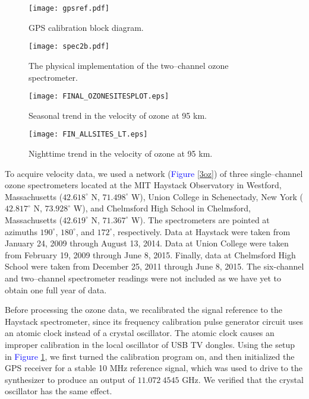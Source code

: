 \documentclass[11pt]{article}
\begin{document}
	\begin{figure}[t]
		\centering
		\texttt{[image: gpsref.pdf]}
		\caption{GPS calibration block diagram.}
		\label{gpsref}
	\end{figure}
	
	\begin{figure}[t]
		\centering
		\centerline{\texttt{[image: spec2b.pdf]}}
		\caption{The physical implementation of the two--channel ozone spectrometer.}
		\label{spectr}
	\end{figure}
	
	\begin{figure}[t]
		\centering
		\centerline{\texttt{[image: FINAL\_OZONESITESPLOT.eps]}}
		\caption{Seasonal trend in the velocity of ozone at 95 km.}
		\label{ozoneresults}
	\end{figure}	
	
	\begin{figure}[t]
		\centering
		\centerline{\texttt{[image: FIN\_ALLSITES\_LT.eps]}}
		\caption{Nighttime trend in the velocity of ozone at 95 km.}
		\label{ozonelt}
	\end{figure}	
	
	
To acquire velocity data, we used a network (\textcolor{blue}{Figure} \ref{3oz}) of three single--channel ozone spectrometers located at the MIT Haystack Observatory in Westford, Massachusetts ($42.618^\circ$ N, $71.498^\circ$ W), Union College in Schenectady, New York ($42.817^\circ$ N, $73.928^\circ$ W), and Chelmsford High School in Chelmsford, Massachusetts ($42.619^\circ$ N, $71.367^\circ$ W). The spectrometers are pointed at azimuths $190^\circ$, $180^\circ$, and $172^\circ$, respectively. Data at Haystack were taken from January 24, 2009 through August 13, 2014. Data at Union College were taken from February 19, 2009 through June 8, 2015. Finally, data at Chelmsford High School were taken from December 25, 2011 through June 8, 2015. The six-channel and two--channel spectrometer readings were not included as we have yet to obtain one full year of data.
	
Before processing the ozone data, we recalibrated the signal reference to the Haystack spectrometer, since its frequency calibration pulse generator circuit uses an atomic clock instead of a crystal oscillator. The atomic clock causes an improper calibration in the local oscillator of USB TV dongles. Using the setup in \textcolor{blue}{Figure} \ref{gpsref}, we first turned the calibration program on, and then initialized the GPS receiver for a stable 10 MHz reference signal, which was used to drive to the synthesizer to produce an output of $11.072~4545$ GHz. We verified that the crystal oscillator has the same effect.
\end{document}
